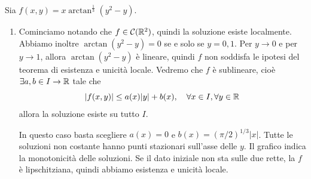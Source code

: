 \documentclass[a4paper]{article}
\begin{document}
\pagebreak

\begin{radioactive}
\begin{snippetsolution}{}
    Sia \(f(x,y) = x\arctan^{\frac13}(y^2 - y)\).
    \begin{enumerate}
        \item Cominciamo notando che \(f \in \mathcal C(\mathbb{R}^2)\),
            quindi la soluzione esiste localmente.
            Abbiamo inoltre \(\arctan(y^2 - y) = 0\) se e solo se \(y=0,1\).
            Per \(y \to 0\) e per \(y \to 1\), allora \(\arctan(y^2 - y)\) è lineare,
            quindi \(f\) non soddisfa le ipotesi del teorema di esistenza e unicità locale.
            Vedremo che \(f\) è sublineare, cioè \(\exists a,b \in I \to \mathbb{R}\) tale che
            \[
                |f(x,y)| \leq a(x)|y| + b(x), \quad \forall x \in I, \forall y \in \mathbb{R}
            \]
            allora la soluzione esiste su tutto \(I\). \\
            \begin{minipage}[t]{0.4\textwidth}
                \vspace{0pt}
                In questo caso basta scegliere \(a(x) = 0\) e \(b(x) = (\pi/2)^{1/3}|x|\).
                Tutte le soluzioni non costante hanno punti stazionari sull'asse delle \(y\).
                Il grafico indica la monotonicità delle soluzioni.
                Se il dato iniziale non sta sulle due rette, la \(f\) è lipschitziana,
                quindi abbiamo esistenza e unicità locale.
            \end{minipage}
            \begin{minipage}[t]{0.6\textwidth}
                \vspace{0pt}
                \begin{center}
\end{center}
\end{minipage}
\end{enumerate}
\end{snippetsolution}
\end{radioactive}
\end{document}
